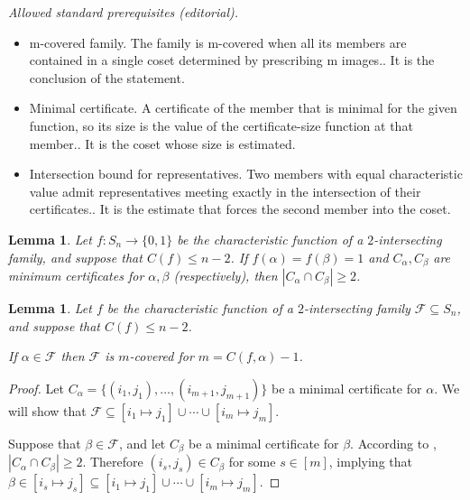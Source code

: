 \documentclass[10pt,a4paper]{article}
\newtheorem{lemma}[theorem]{Lemma}
\theoremstyle{definition}
\providecommand{\coset}[2]{[#1 \mapsto #2]}
\begin{document}
\noindent\textit{Allowed standard prerequisites (editorial).}\begin{itemize}
\item m-covered family. The family is m-covered when all its members are contained in a single coset determined by prescribing m images.. It is the conclusion of the statement.
\item Minimal certificate. A certificate of the member that is minimal for the given function, so its size is the value of the certificate-size function at that member.. It is the coset whose size is estimated.
\item Intersection bound for representatives. Two members with equal characteristic value admit representatives meeting exactly in the intersection of their certificates.. It is the estimate that forces the second member into the coset.
\end{itemize}\medskip

\begin{lemma} \label{lem:2-int-coset-sym}
Let $f\colon S_n \to \{0,1\}$ be the characteristic function of a $2$-intersecting family, and suppose that $C(f) \leq n-2$. If $f(\alpha) = f(\beta) = 1$ and $C_\alpha,C_\beta$ are minimum certificates for $\alpha,\beta$ (respectively), then $|C_\alpha \cap C_\beta| \geq 2$.
\end{lemma}

\begin{lemma} \label{lem:covering-sym}
Let $f$ be the characteristic function of a $2$-intersecting family $\mathcal{F} \subseteq S_n$, and suppose that $C(f) \leq n-2$.

If $\alpha \in \mathcal{F}$ then $\mathcal{F}$ is $m$-covered for $m = C(f,\alpha) - 1$.
\end{lemma}

\begin{proof}
Let $C_\alpha = \{(i_1,j_1),\ldots,(i_{m+1},j_{m+1})\}$ be a minimal certificate for $\alpha$. We will show that $\mathcal{F} \subseteq \coset{i_1}{j_1} \cup \cdots \cup \coset{i_m}{j_m}$.

Suppose that $\beta \in \mathcal{F}$, and let $C_\beta$ be a minimal certificate for $\beta$. According to , $|C_\alpha \cap C_\beta| \geq 2$. Therefore $(i_s,j_s) \in C_\beta$ for some $s \in [m]$, implying that $\beta \in \coset{i_s}{j_s} \subseteq \coset{i_1}{j_1} \cup \cdots \cup \coset{i_m}{j_m}$.
\end{proof}
\end{document}
